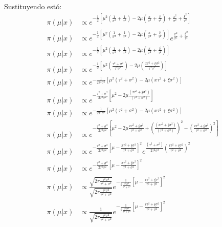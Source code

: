 \documentclass[12pt,]{article}
\begin{document}
Sustituyendo estó: \[
\begin{array}{rl}
\pi(\mu|x) & \propto e^{-\frac{1}{2}\left[ \mu^2\left(\frac{1}{\sigma^2}+\frac{1}{\tau^2}\right) -2\mu\left(\frac{x}{\sigma^2}+\frac{\xi}{\tau^2}\right)+\frac{x^2}{\sigma^2}+\frac{\xi^2}{\tau^2}\right]}\\
\pi(\mu|x) & \propto e^{-\frac{1}{2}\left[ \mu^2\left(\frac{1}{\sigma^2}+\frac{1}{\tau^2}\right) -2\mu\left(\frac{x}{\sigma^2}+\frac{\xi}{\tau^2}\right)\right]} e^{\frac{x^2}{\sigma^2}+\frac{\xi^2}{\tau^2}}\\
\pi(\mu|x) & \propto e^{-\frac{1}{2}\left[ \mu^2\left(\frac{1}{\sigma^2}+\frac{1}{\tau^2}\right) -2\mu\left(\frac{x}{\sigma^2}+\frac{\xi}{\tau^2}\right)\right]}\\
\pi(\mu|x) & \propto e^{-\frac{1}{2}\left[ \mu^2\left(\frac{\tau^2+\sigma^2}{\tau^2 \sigma^2}\right) -2\mu\left(\frac{x\tau^2+\xi\sigma^2}{\tau^2\sigma^2}\right)\right]}\\
\pi(\mu|x) & \propto e^{-\frac{1}{2\tau^2\sigma^2}[ \mu^2(\tau^2+\sigma^2) -2\mu(x\tau^2+\xi\sigma^2)]}\\
\pi(\mu|x) & \propto e^{-\frac{\tau^2+\sigma^2}{2\tau^2\sigma^2}\left[ \mu^2 -2\mu\frac{(x\tau^2+\xi\sigma^2)}{(\tau^2+\sigma^2)}\right]}\\
\pi(\mu|x) & \propto e^{-\frac{1}{2\tau^2\sigma^2}[ \mu^2(\tau^2+\sigma^2) -2\mu(x\tau^2+\xi\sigma^2)]}\\
\pi(\mu|x) & \propto e^{-\frac{\tau^2+\sigma^2}{2\tau^2\sigma^2}\left[ \mu^2 -2\mu\frac{x\tau^2+\xi\sigma^2}{\tau^2+\sigma^2}+\left( \frac{(x\tau^2+\xi\sigma^2)}{(\tau^2+\sigma^2)} \right)^2-\left( \frac{x\tau^2+\xi\sigma^2}{\tau^2+\sigma^2} \right)^2\right]}\\
\pi(\mu|x) & \propto e^{-\frac{\tau^2+\sigma^2}{2\tau^2\sigma^2}\left[ \mu -\frac{x\tau^2+\xi\sigma^2}{\tau^2+\sigma^2}\right]^2}e^{\frac{(\tau^2+\sigma^2)}{2\tau^2\sigma^2}\left( \frac{x\tau^2+\xi\sigma^2}{\tau^2+\sigma^2} \right)^2}\\
\pi(\mu|x) & \propto e^{-\frac{\tau^2+\sigma^2}{2\tau^2\sigma^2}\left[ \mu -\frac{x\tau^2+\xi\sigma^2}{\tau^2+\sigma^2}\right]^2}\\
\pi(\mu|x) & \propto \frac{\sqrt{2\pi\frac{\tau^2\sigma^2}{\tau^2+\sigma^2}}}{\sqrt{2\pi\frac{\tau^2\sigma^2}{\tau^2+\sigma^2}}} e^{-\frac{1}{2\frac{\tau^2\sigma^2}{\tau^2+\sigma^2}}\left[ \mu -\frac{x\tau^2+\xi\sigma^2}{\tau^2+\sigma^2}\right]^2}\\
\pi(\mu|x) & \propto \frac{1}{\sqrt{2\pi\frac{\tau^2\sigma^2}{\tau^2+\sigma^2}}}e^{-\frac{1}{2\frac{\tau^2\sigma^2}{\tau^2+\sigma^2}}\left[ \mu -\frac{x\tau^2+\xi\sigma^2}{\tau^2+\sigma^2}\right]^2}\\
\end{array}
\]
\end{document}
